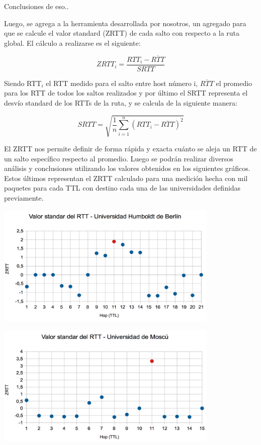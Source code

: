 Conclusiones de eso..

Luego, se agrega a la herramienta desarrollada por nosotros, un agregado para que se calcule el valor standard (ZRTT) de cada salto con respecto a la ruta global. El cálculo a realizarse es el siguiente:

 \begin{equation}
 	ZRTT_i = \frac{RTT_i - \overline{RTT}}{SRTT} 
 \end{equation}

 Siendo RTT$_{i}$ el RTT medido para el salto entre host número i, $\overline{RTT}$ el promedio para los RTT de todos los saltos realizados y por último el SRTT representa el desvío standard de los RTTs de la ruta, y se calcula de la siguiente manera:

\begin{equation}
 	SRTT = \sqrt{\frac{1}{n} \sum_{i=1}^{n} (RTT_i - \overline{RTT})^2}
 \end{equation}

El ZRTT nos permite definir de forma rápida y exacta cuánto se aleja un RTT de un salto específico respecto al promedio. Luego se podrán realizar diversos análisis y conclusiones utilizando los valores obtenidos en los siguientes gráficos. Estos últimos representan el ZRTT calculado para una medición hecha con mil paquetes para cada TTL con destino cada una de las universidades definidas previamente. 

\centerline{\includegraphics[width=0.8\textwidth]{imagenes/1ra_parte/Alemania_3ergrafico.png}}

\centerline{\includegraphics[width=0.8\textwidth]{imagenes/1ra_parte/Rusia_3ergrafico.png}}

